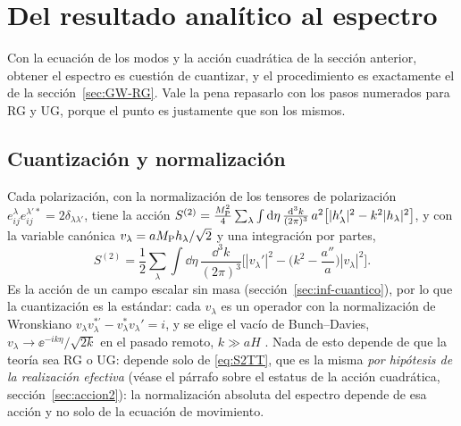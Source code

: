 \section{Del resultado analítico al espectro}
\label{sec:espectro}

Con la ecuación de los modos y la acción cuadrática de la sección anterior, obtener el espectro es cuestión de cuantizar, y el procedimiento es exactamente el de la sección~\ref{sec:GW-RG}. Vale la pena repasarlo con los pasos numerados para RG y UG, porque el punto es justamente que son los mismos.

\subsection{Cuantización y normalización}
\label{sec:normalizacion}

Cada polarización, con la normalización de los tensores de polarización $e^\lambda_{ij}e^{\lambda'*}_{ij}=2\delta_{\lambda\lambda'}$, tiene la acción $S^{(2)}=\frac{M_{\rm P}^2}{4}\sum_\lambda\int\mathrm d\eta\,\frac{\mathrm d^3k}{(2\pi)^3}\,a^2\big[|h_\lambda'|^2-k^2|h_\lambda|^2\big]$, y con la variable canónica $v_\lambda=aM_{\rm P} h_\lambda/\sqrt2$ y una integración por partes,
\begin{equation}
S^{(2)}=\frac12\sum_\lambda\int\dd\eta\,\frac{\dd^3k}{(2\pi)^3}\Big[|v_\lambda'|^2-\Big(k^2-\frac{a''}{a}\Big)|v_\lambda|^2\Big].
\label{eq:S2v}
\end{equation}
Es la acción de un campo escalar sin masa (sección~\ref{sec:inf-cuantico}), por lo que la cuantización es la estándar: cada $v_\lambda$ es un operador con la normalización de Wronskiano $v_\lambda v_\lambda^{*\prime}-v_\lambda^*v_\lambda'=i$, y se elige el vacío de Bunch--Davies, $v_\lambda\to\ee^{-ik\eta}/\sqrt{2k}$ en el pasado remoto, $k\gg aH$ . Nada de esto depende de que la teoría sea RG o UG: depende solo de \eqref{eq:S2TT}, que es la misma \emph{por hipótesis de la realización efectiva} (véase el párrafo sobre el estatus de la acción cuadrática, sección~\ref{sec:accion2}): la normalización absoluta del espectro depende de esa acción y no solo de la ecuación de movimiento.

